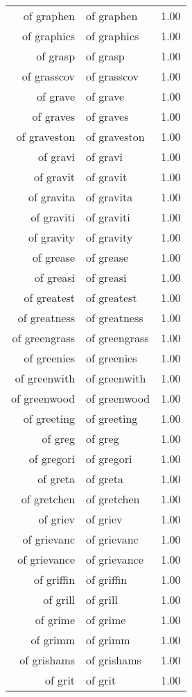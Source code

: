 \begin{table}[ht]
\begin{tabular}{rlr}
  of graphen & of graphen & 1.00 \\ 
  of graphics & of graphics & 1.00 \\ 
  of grasp & of grasp & 1.00 \\ 
  of grasscov & of grasscov & 1.00 \\ 
  of grave & of grave & 1.00 \\ 
  of graves & of graves & 1.00 \\ 
  of graveston & of graveston & 1.00 \\ 
  of gravi & of gravi & 1.00 \\ 
  of gravit & of gravit & 1.00 \\ 
  of gravita & of gravita & 1.00 \\ 
  of graviti & of graviti & 1.00 \\ 
  of gravity & of gravity & 1.00 \\ 
  of grease & of grease & 1.00 \\ 
  of greasi & of greasi & 1.00 \\ 
  of greatest & of greatest & 1.00 \\ 
  of greatness & of greatness & 1.00 \\ 
  of greengrass & of greengrass & 1.00 \\ 
  of greenies & of greenies & 1.00 \\ 
  of greenwith & of greenwith & 1.00 \\ 
  of greenwood & of greenwood & 1.00 \\ 
  of greeting & of greeting & 1.00 \\ 
  of greg & of greg & 1.00 \\ 
  of gregori & of gregori & 1.00 \\ 
  of greta & of greta & 1.00 \\ 
  of gretchen & of gretchen & 1.00 \\ 
  of griev & of griev & 1.00 \\ 
  of grievanc & of grievanc & 1.00 \\ 
  of grievance & of grievance & 1.00 \\ 
  of griffin & of griffin & 1.00 \\ 
  of grill & of grill & 1.00 \\ 
  of grime & of grime & 1.00 \\ 
  of grimm & of grimm & 1.00 \\ 
  of grishams & of grishams & 1.00 \\ 
  of grit & of grit & 1.00 \\ 

\end{tabular}
\end{table}

